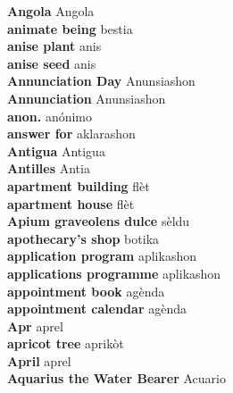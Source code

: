 \textbf{ Angola  } Angola \\
\textbf{ animate being  } bestia \\
\textbf{ anise plant  } anis \\
\textbf{ anise seed  } anis \\
\textbf{ Annunciation Day  } Anunsiashon \\
\textbf{ Annunciation  } Anunsiashon \\
\textbf{ anon.  } anónimo \\
\textbf{ answer for  } aklarashon \\
\textbf{ Antigua  } Antigua \\
\textbf{ Antilles  } Antia \\
\textbf{ apartment building  } flèt \\
\textbf{ apartment house  } flèt \\
\textbf{ Apium graveolens dulce  } sèldu \\
\textbf{ apothecary’s shop  } botika \\
\textbf{ application program  } aplikashon \\
\textbf{ applications programme  } aplikashon \\
\textbf{ appointment book  } agènda \\
\textbf{ appointment calendar  } agènda \\
\textbf{ Apr  } aprel \\
\textbf{ apricot tree  } aprikòt \\
\textbf{ April  } aprel \\
\textbf{ Aquarius the Water Bearer  } Acuario \\
